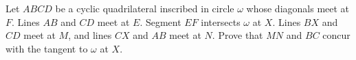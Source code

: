 Let $ABCD$ be a cyclic quadrilateral inscribed in circle $\omega$ whose diagonals meet at $F$.  Lines $AB$ and $CD$ meet at $E$.  Segment $EF$ intersects $\omega$ at $X$.  Lines $BX$ and $CD$ meet at $M$, and lines $CX$ and $AB$ meet at $N$.  Prove that $MN$ and $BC$ concur with the tangent to $\omega$ at $X$.

